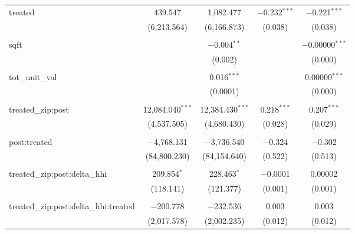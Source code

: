 \begin{table}[H]
{\begin{tabular}{@{\extracolsep{5pt}}lcccc}
  treated & 439.547 & 1,082.477 & $-$0.232$^{***}$ & $-$0.221$^{***}$ \\  

   & (6,213.564) & (6,166.873) & (0.038) & (0.038) \\  

   & & & & \\  

  sqft &  & $-$0.004$^{**}$ &  & $-$0.00000$^{***}$ \\  

   &  & (0.002) &  & (0.000) \\  

   & & & & \\  

  tot\_unit\_val &  & 0.016$^{***}$ &  & 0.00000$^{***}$ \\  

   &  & (0.0001) &  & (0.000) \\  

   & & & & \\  

  treated\_zip:post & 12,084.040$^{***}$ & 12,384.430$^{***}$ & 0.218$^{***}$ & 0.207$^{***}$ \\  

   & (4,537.505) & (4,680.430) & (0.028) & (0.029) \\  

   & & & & \\  

  post:treated & $-$4,768.131 & $-$3,736.540 & $-$0.324 & $-$0.302 \\  

   & (84,800.230) & (84,154.640) & (0.522) & (0.513) \\  

   & & & & \\  

  treated\_zip:post:delta\_hhi & 209.854$^{*}$ & 228.463$^{*}$ & $-$0.0001 & 0.00002 \\  

   & (118.141) & (121.377) & (0.001) & (0.001) \\  

   & & & & \\  

  treated\_zip:post:delta\_hhi:treated & $-$200.778 & $-$232.536 & 0.003 & 0.003 \\  

   & (2,017.578) & (2,002.235) & (0.012) & (0.012) \\  


\end{tabular}}
\end{table}
